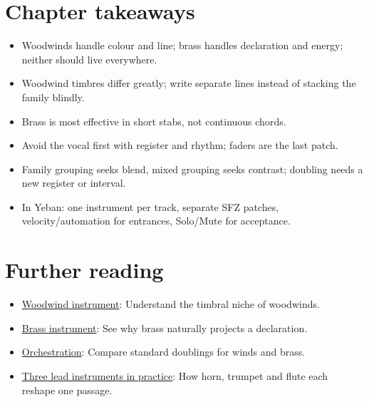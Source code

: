 \section{Chapter takeaways}
\label{sec:winds-takeaways}

\begin{itemize}
\item Woodwinds handle colour and line; brass handles declaration and energy; neither should live everywhere.
\item Woodwind timbres differ greatly; write separate lines instead of stacking the family blindly.
\item Brass is most effective in short stabs, not continuous chords.
\item Avoid the vocal first with register and rhythm; faders are the last patch.
\item Family grouping seeks blend, mixed grouping seeks contrast; doubling needs a new register or interval.
\item In Yeban: one instrument per track, separate SFZ patches, velocity/automation for entrances, Solo/Mute for acceptance.
\end{itemize}

\section{Further reading}
\label{sec:07-winds-brass-further-reading}
\begin{itemize}
  \item \href{https://en.wikipedia.org/wiki/Woodwind_instrument}{Woodwind instrument}: Understand the timbral niche of woodwinds.
  \item \href{https://en.wikipedia.org/wiki/Brass_instrument}{Brass instrument}: See why brass naturally projects a declaration.
  \item \href{https://en.wikipedia.org/wiki/Orchestration}{Orchestration}: Compare standard doublings for winds and brass.
  \item \href{https://www.youtube.com/watch?v=Mf6ZKAV0ZU4}{Three lead instruments in practice}: How horn, trumpet and flute each reshape one passage.
\end{itemize}

